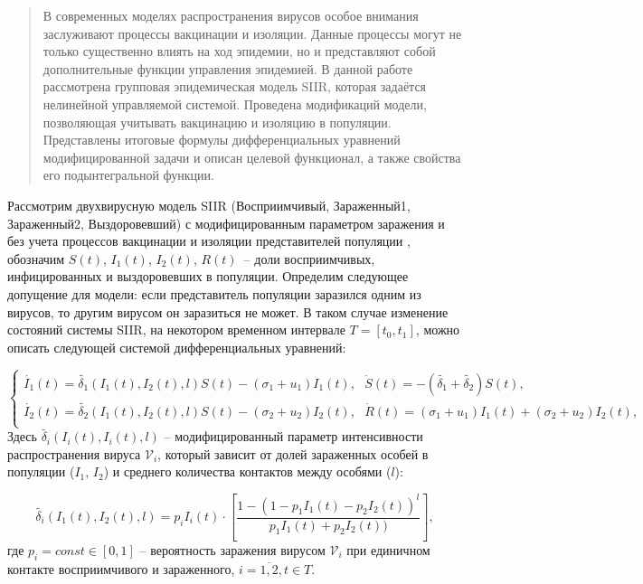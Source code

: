 \begin{abstract}
В современных моделях распространения вирусов особое внимания заслуживают процессы вакцинации и изоляции. Данные процессы могут не только существенно влиять на ход эпидемии, но и представляют собой дополнительные функции управления эпидемией. В данной работе рассмотрена групповая эпидемическая модель SIIR, которая задаётся нелинейной управляемой системой. Проведена модификаций модели, позволяющая учитывать вакцинацию и изоляцию в популяции. Представлены итоговые формулы дифференциальных уравнений модифицированной задачи и описан целевой функционал, а также свойства его подынтегральной функции.

\end{abstract}

Рассмотрим двухвирусную модель SIIR (Восприимчивый, Зараженный1, Зараженный2, Выздоровевший) с модифицированным параметром заражения и без учета процессов вакцинации и изоляции представителей популяции \cite{kosyan}, обозначим $S(t)$, $I_1(t)$, $I_2(t)$, $R(t)$~-- доли восприимчивых, инфицированных и выздоровевших в популяции. Определим следующее допущение для модели: если представитель популяции заразился одним из вирусов, то другим вирусом он заразиться не может. В таком случае изменение состояний системы SIIR, на некотором временном интервале $T = [t_0, t_1]$, можно описать следующей системой дифференциальных уравнений:

\begin{equation}\label{SIIR_sys}
	\begin{cases}
        \dot{I_1}(t)=\widetilde{\delta_1}(I_1(t),I_2(t),l) S(t) - (\sigma_1 + u_1)I_1(t), 
        \ \ \
		\dot{S}(t)=-(\widetilde{\delta_1} + \widetilde{\delta_2})S(t), \\
        \dot{I_2}(t)=\widetilde{\delta_2}(I_1(t),I_2(t),l) S(t) - (\sigma_2 + u_2)I_2(t), 	\ \ \
		\dot{R}(t)=(\sigma_1+u_1) I_1(t)+(\sigma_2+u_2 )I_2(t), \\
	\end{cases}
\end{equation}
Здесь $\widetilde{\delta_i}(I_i(t),I_i(t),l)$ -- модифицированный параметр интенсивности распространения вируса $\mathcal{V}_i$, который зависит от долей зараженных особей в популяции ($I_1$, $I_2$) и среднего количества контактов между особями ($l$): 

\begin{equation}\label{mod_delta}
    \widetilde{\delta_i}(I_1(t),I_2(t),l) = p_i I_i(t) \cdot \left[ \frac{1-(1 - p_1 I_1(t) - p_2 I_2(t))^l}{p_1 I_1(t) + p_2 I_2(t))} \right],
\end{equation}
где $p_i = const \in [0,1]$ -- вероятность заражения вирусом $\mathcal{V}_i$ при единичном контакте восприимчивого и зараженного, $i=\overline{1,2}, t \in T$.

